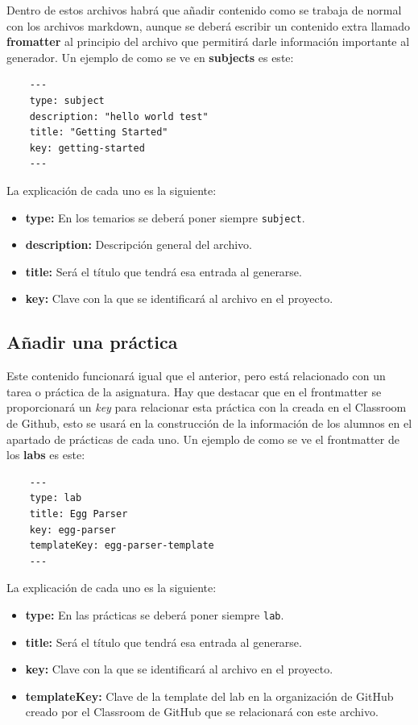 Dentro de estos archivos habrá que añadir contenido como se trabaja de normal con los archivos markdown, aunque se deberá escribir un contenido extra llamado \textbf{fromatter} al principio del archivo que permitirá darle información importante al generador. Un ejemplo de como se ve en \textbf{subjects} es este:

\begin{verbatim}
    ---
    type: subject
    description: "hello world test"
    title: "Getting Started"
    key: getting-started
    ---
\end{verbatim}

La explicación de cada uno es la siguiente:

\begin{itemize}
    \item \textbf{type:} En los temarios se deberá poner siempre \verb|subject|.
    \item \textbf{description:} Descripción general del archivo.
    \item \textbf{title:} Será el título que tendrá esa entrada al generarse.
    \item \textbf{key:} Clave con la que se identificará al archivo en el proyecto.
\end{itemize}

\subsection{Añadir una práctica}

Este contenido funcionará igual que el anterior, pero está relacionado con un tarea o práctica de la asignatura. Hay que destacar que en el frontmatter se proporcionará un \textit{key} para relacionar esta práctica con la creada en el Classroom de Github, esto se usará en la construcción de la información de los alumnos en el apartado de prácticas de cada uno. Un ejemplo de como se ve el frontmatter de los \textbf{labs} es este:

\begin{verbatim}
    ---
    type: lab
    title: Egg Parser
    key: egg-parser
    templateKey: egg-parser-template
    ---
\end{verbatim}

La explicación de cada uno es la siguiente:

\begin{itemize}
    \item \textbf{type:} En las prácticas se deberá poner siempre \verb|lab|.
    \item \textbf{title:} Será el título que tendrá esa entrada al generarse.
    \item \textbf{key:} Clave con la que se identificará al archivo en el proyecto.
    \item \textbf{templateKey:} Clave de la template del lab en la organización de GitHub creado por el Classroom de GitHub que se relacionará con este archivo.
\end{itemize}

